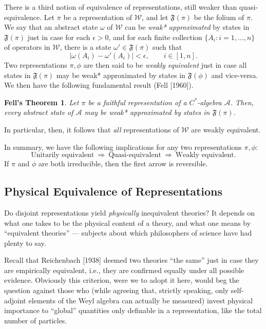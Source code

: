 \documentclass[12pt]{article}
\newtheorem*{fell}{Fell's Theorem}
\theoremstyle{remark}
\theoremstyle{definition}
\newcommand{\alg}[1]{\mathcal{#1}}
\begin{document}
There is a third notion of equivalence of representations, still weaker than 
quasi-equivalence.  Let $\pi$ be a representation of $\alg{W}$, and let
$\mathfrak{F}(\pi)$ be the folium of $\pi$.  We say that an abstract
state $\omega$ of $\alg{W}$ can be \emph{weak* approximated} by states
in $\mathfrak{F}(\pi)$ just in case for each $\epsilon >0$, and for
each finite collection $\{ A_{i}:i=1,\dots ,n\}$ of operators in
$\alg{W}$, there is a state $\omega '\in \mathfrak{F}(\pi )$ such that
\begin{equation} \left| \omega (A_{i})-\omega '(A_{i}) \right|
  <\epsilon , \qquad i\in [1,n].\end{equation}
Two representations $\pi ,\phi$ are then said to be \emph{weakly equivalent} just
in case all states in $\mathfrak{F}(\pi )$ may be weak* approximated by
states in $\mathfrak{F}(\phi )$ and vice-versa.  We then have the 
following fundamental result (Fell [1960]).  
\begin{fell}  Let $\pi$ be a faithful representation of a $C^{*}$-algebra
 $\alg{A}$.  Then,
  every abstract state of $\alg{A}$ may be weak* approximated by
  states in $\mathfrak{F}(\pi )$.  \end{fell}
\noindent In particular, then, it follows that \emph{all} representations of
$\alg{W}$ are weakly equivalent.

In summary, we have the following implications for any two
representations $\pi ,\phi$: 
\begin{equation*} \mbox{Unitarily equivalent}\ 
\Longrightarrow\ \mbox{Quasi-equivalent}\ \Longrightarrow\ 
\mbox{Weakly equivalent}. \end{equation*} 
    If $\pi$ and $\phi$ are both
irreducible, then the first arrow is reversible. 

\subsection{Physical Equivalence of Representations}
Do disjoint representations yield \emph{physically} inequivalent
theories?  It depends on what one takes to be the physical content of
a theory, and what one means by ``equivalent theories'' --- subjects
about which philosophers of science have had plenty to say.

Recall that Reichenbach [1938] deemed two theories ``the same'' just
in case they are empirically equivalent, i.e., they are confirmed
equally under all possible evidence.  Obviously this criterion, were
we to adopt it here, would beg the question against those who (while
agreeing that, strictly speaking, only self-adjoint elements of the
Weyl algebra can actually be measured) invest physical importance to
``global'' quantities only definable in a representation, like the
total number of particles.
\end{document}
